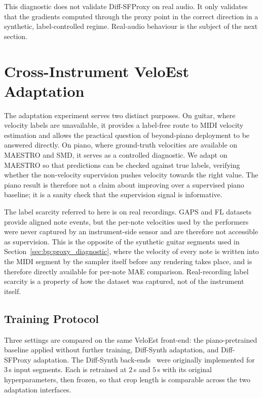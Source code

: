 This diagnostic does not validate Diff-SFProxy on real audio. It only validates that the gradients computed through the proxy point in the correct direction in a synthetic, label-controlled regime. Real-audio behaviour is the subject of the next section.

\section{Cross-Instrument VeloEst Adaptation}
\label{sec:bp:adaptation_results}

The adaptation experiment serves two distinct purposes. On guitar, where velocity labels are unavailable, it provides a label-free route to MIDI velocity estimation and allows the practical question of beyond-piano deployment to be answered directly. On piano, where ground-truth velocities are available on MAESTRO and SMD, it serves as a controlled diagnostic. We adapt on MAESTRO so that predictions can be checked against true labels, verifying whether the non-velocity supervision pushes velocity towards the right value. The piano result is therefore not a claim about improving over a supervised piano baseline; it is a sanity check that the supervision signal is informative.

The label scarcity referred to here is on real recordings. GAPS and FL datasets provide aligned note events, but the per-note velocities used by the performers were never captured by an instrument-side sensor and are therefore not accessible as supervision. This is the opposite of the synthetic guitar segments used in Section~\ref{sec:bp:proxy_diagnostic}, where the velocity of every note is written into the MIDI segment by the sampler itself before any rendering takes place, and is therefore directly available for per-note MAE comparison. Real-recording label scarcity is a property of how the dataset was captured, not of the instrument itself.

\subsection{Training Protocol}
\label{ssec:bp:adapt_train}

Three settings are compared on the same VeloEst front-end: the piano-pretrained baseline applied without further training, Diff-Synth adaptation, and Diff-SFProxy adaptation. The Diff-Synth back-ends~\cite{renault2023ddsp_piano, jonason2024guitar} were originally implemented for $3$\,s input segments. Each is retrained at $2$\,s and $5$\,s with its original hyperparameters, then frozen, so that crop length is comparable across the two adaptation interfaces.

